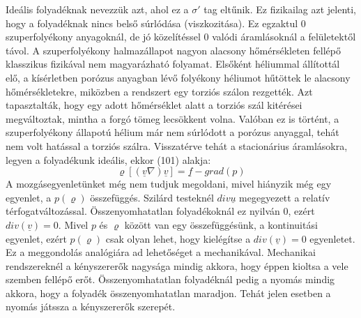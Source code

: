 \documentclass[a4paper,12pt]{article}
\begin{document}
Ideális folyadéknak nevezzük azt, ahol ez a $\sigma'$ tag eltűnik. Ez fizikailag azt jelenti, hogy a folyadéknak nincs belső súrlódása (viszkozitása). Ez egzaktul 0 szuperfolyékony anyagoknál, de jó közelítéssel 0 valódi áramlásoknál a felületektől távol. A szuperfolyékony halmazállapot nagyon alacsony hőmérsékleten fellépő klasszikus fizikával nem magyarázható folyamat. Elsőként héliummal állítottál elő, a kísérletben porózus anyagban lévő folyékony héliumot hűtöttek le alacsony hőmérsékletekre, miközben a rendszert egy torziós szálon rezgették. Azt tapasztalták, hogy egy adott hőmérséklet alatt a torziós szál kitérései megváltoztak, mintha a forgó tömeg lecsökkent volna. Valóban ez is történt, a szuperfolyékony állapotú hélium már nem súrlódott a porózus anyaggal, tehát nem volt hatással a torziós szálra.
Visszatérve tehát a stacionárius áramlásokra, legyen a folyadékunk ideális, ekkor (101) alakja:
\begin{equation}
\varrho\left[(\underline{v}\nabla)\underline{v}\right]=\underline{f}-grad(p)
\end{equation}
A mozgásegyenletünket még nem tudjuk megoldani, mivel hiányzik még egy egyenlet, a $p(\varrho)$ összefüggés. Szilárd testeknél $div\underline{u}$ megegyezett a relatív térfogatváltozással. Összenyomhatatlan folyadékoknál ez nyilván 0, ezért $div(\underline{v})=0$. Mivel $p$ és $\varrho$ között van egy összefüggésünk, a kontinuitási egyenlet, ezért $p(\varrho)$ csak olyan lehet, hogy kielégítse a $div(\underline{v})=0$ egyenletet. Ez a meggondolás analógiára ad lehetőséget a mechanikával. Mechanikai rendszereknél a kényszererők nagysága mindig akkora, hogy éppen kioltsa a vele szemben fellépő erőt. Összenyomhatatlan folyadéknál pedig a nyomás mindig akkora, hogy a folyadék összenyomhatatlan maradjon. Tehát jelen esetben a nyomás játssza a kényszererők szerepét.
 
\end{document}
